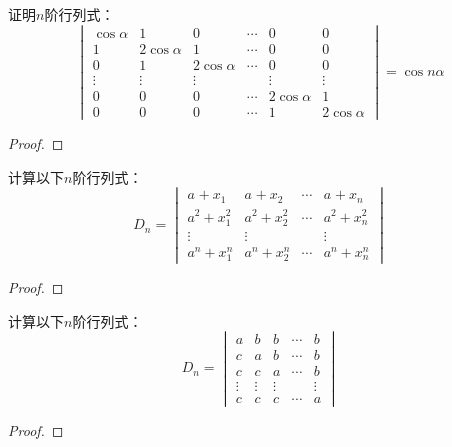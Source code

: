 \begin{problem}
证明\(n\)阶行列式：
\begin{equation*}
    \begin{vmatrix}
        \cos\alpha & 1           & 0           & \cdots & 0           & 0           \\
        1          & 2\cos\alpha & 1           & \cdots & 0           & 0           \\
        0          & 1           & 2\cos\alpha & \cdots & 0           & 0           \\
        \vdots     & \vdots      & \vdots      &        & \vdots      & \vdots      \\
        0          & 0           & 0           & \cdots & 2\cos\alpha & 1           \\
        0          & 0           & 0           & \cdots & 1           & 2\cos\alpha
    \end{vmatrix}=\cos n\alpha
\end{equation*}
\end{problem}
\begin{proof}
\end{proof}

\begin{problem}
计算以下\(n\)阶行列式：
\begin{equation*}
    D_n=
    \begin{vmatrix}
        a^{}+x_1^{}   & a^{}+x_2^{}   & \cdots & a^{}+x_n^{}   \\
        a^{2}+x_1^{2} & a^{2}+x_2^{2} & \cdots & a^{2}+x_n^{2} \\
        \vdots        & \vdots        &        & \vdots        \\
        a^{n}+x_1^{n} & a^{n}+x_2^{n} & \cdots & a^{n}+x_n^{n}
    \end{vmatrix}
\end{equation*}
\end{problem}
\begin{proof}
\end{proof}

\begin{problem}
计算以下\(n\)阶行列式：
\begin{equation*}
    D_n=
    \begin{vmatrix}
        a      & b      & b      & \cdots & b      \\
        c      & a      & b      & \cdots & b      \\
        c      & c      & a      & \cdots & b      \\
        \vdots & \vdots & \vdots &        & \vdots \\
        c      & c      & c      & \cdots & a
    \end{vmatrix}
\end{equation*}
\end{problem}
\begin{proof}
\end{proof}

